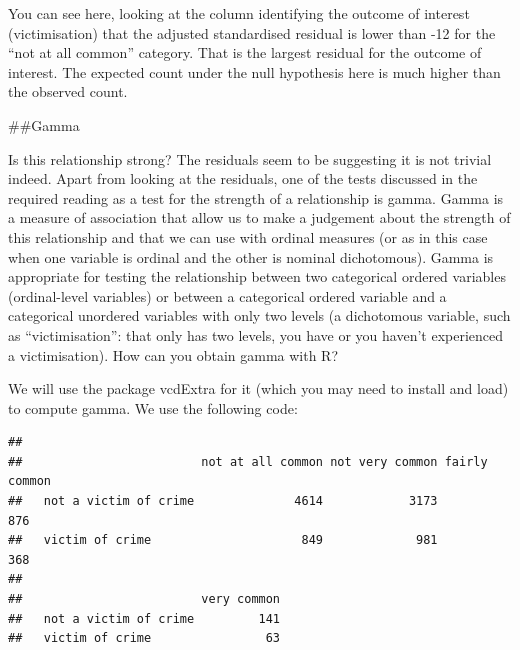 \documentclass[]{book}
\newenvironment{Shaded}{\begin{snugshade}}{\end{snugshade}}
\newcommand{\CommentTok}[1]{\textcolor[rgb]{0.56,0.35,0.01}{\textit{#1}}}
\newcommand{\FloatTok}[1]{\textcolor[rgb]{0.00,0.00,0.81}{#1}}
\newcommand{\KeywordTok}[1]{\textcolor[rgb]{0.13,0.29,0.53}{\textbf{#1}}}
\newcommand{\NormalTok}[1]{#1}
\newcommand{\OperatorTok}[1]{\textcolor[rgb]{0.81,0.36,0.00}{\textbf{#1}}}
\theoremstyle{definition}
\theoremstyle{definition}
\theoremstyle{definition}
\theoremstyle{remark}
\begin{document}
You can see here, looking at the column identifying the outcome of
interest (victimisation) that the adjusted standardised residual is
lower than -12 for the ``not at all common'' category. That is the
largest residual for the outcome of interest. The expected count under
the null hypothesis here is much higher than the observed count.

\#\#Gamma

Is this relationship strong? The residuals seem to be suggesting it is
not trivial indeed. Apart from looking at the residuals, one of the
tests discussed in the required reading as a test for the strength of a
relationship is gamma. Gamma is a measure of association that allow us
to make a judgement about the strength of this relationship and that we
can use with ordinal measures (or as in this case when one variable is
ordinal and the other is nominal dichotomous). Gamma is appropriate for
testing the relationship between two categorical ordered variables
(ordinal-level variables) or between a categorical ordered variable and
a categorical unordered variables with only two levels (a dichotomous
variable, such as ``victimisation'': that only has two levels, you have
or you haven't experienced a victimisation). How can you obtain gamma
with R?

We will use the package vcdExtra for it (which you may need to install
and load) to compute gamma. We use the following code:

\begin{Shaded}
\end{Shaded}

\begin{verbatim}
##                        
##                         not at all common not very common fairly common
##   not a victim of crime              4614            3173           876
##   victim of crime                     849             981           368
##                        
##                         very common
##   not a victim of crime         141
##   victim of crime                63
\end{verbatim}
\end{document}
